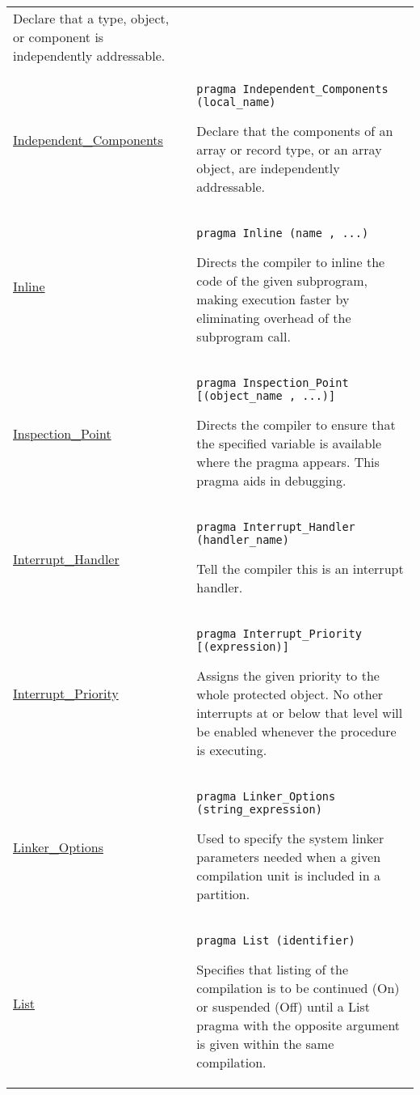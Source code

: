 \documentclass[english]{article}
\begin{document}
\begin{scriptsize}
\begin{multicols*}{3}
\begin{tabular}{@{}p{2cm}p{6.5cm}}
   Declare that a type, object, or component is independently addressable.\\

   \href{http://www.ada-auth.org/standards/22rm/html/RM-J-15-8.html}{Independent\_Components} & \texttt{pragma Independent\_Components
    (local\_name)}

    Declare that the components of an array or record type, or an array object, are independently addressable.\\

   \href{http://www.ada-auth.org/standards/22rm/html/RM-J-15-1.html}{Inline} & \texttt{pragma Inline (name {, ...})}

   Directs the compiler to inline the code of the given subprogram, making execution faster by eliminating overhead of the subprogram call.\\

   \href{http://www.ada-auth.org/standards/22rm/html/RM-H-3-2.html}{Inspection\_Point} & \texttt{pragma Inspection\_Point [(object\_name {, ...})]}

   Directs the compiler to ensure that the specified variable is available where the pragma appears. This pragma aids in debugging.\\

   \href{http://www.ada-auth.org/standards/22rm/html/RM-J-15-7.html}{Interrupt\_Handler} & \texttt{pragma Interrupt\_Handler (handler\_name)}

   Tell the compiler this is an interrupt handler.\\

   \href{http://www.ada-auth.org/standards/22rm/html/RM-J-15-11.html}{Interrupt\_Priority} & \texttt{pragma Interrupt\_Priority [(expression)]}

   Assigns the given priority to the whole protected object. No other interrupts at or below that level will be enabled whenever the procedure is executing.\\

   \href{http://www.ada-auth.org/standards/22rm/html/RM-B-1.html}{Linker\_Options} & \texttt{pragma Linker\_Options (string\_expression)}

   Used to specify the system linker parameters needed when a given compilation unit is included in a partition.\\

   \href{http://www.ada-auth.org/standards/22rm/html/RM-2-8.html}{List} & \texttt{pragma List (identifier)}

   Specifies that listing of the compilation is to be continued (On) or suspended (Off) until a List pragma with the opposite argument is given within the same compilation.\\


\end{tabular}
\end{multicols*}
\end{scriptsize}
\end{document}
